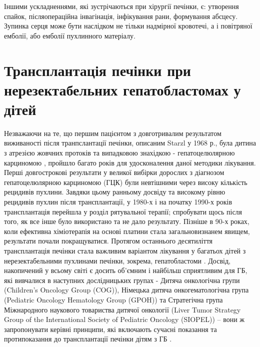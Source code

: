 Іншими ускладненнями, які зустрічаються при хірургії печінки, є: утворення спайок, післяопераційна інвагінація, інфікування рани, формування абсцесу. Зупинка серця може бути наслідком не тільки надмірної кровотечі, а і повітряної емболії, або емболії пухлинного матеріалу. 

\section{Трансплантація печінки при нерезектабельних гепатобластомах у дітей}
Незважаючи на те, що першим пацієнтом з довготривалим результатом виживаності після транпслантації печінки, описаним Starzl у 1968 р., була дитина з атрезією жовчних протоків та випадковою знахідкою - гепатоцелюлярною карциномою \cite{pmid24734315}, пройшло багато років для удосконалення даної методики лікування. Перші довгострокові результати у великої вибірки дорослих з діагнозом гепатоцелюлярною карциномою (ГЦК) були невтішними через високу кількість рецидивів пухлини. Завдяки цьому ранньому досвіду та високому рівню рецидивів пухлин після трансплантації, у 1980-х і на початку 1990-х років трансплантація перейшла у розділ рятувальної терапії; спробувати щось після того, як все інше було використано та не дало результату. Пізніше в 90-х роках, коли ефективна хіміотерапія на основі платини стала загальновизнанем явищем, результати почали покращуватися. Протягом останнього десятиліття трансплантація печінки стала важливим варіантом лікування у багатьох дітей з нерезектабельними пухлинами печінки, зокрема, гепатобластоми \cite{pmid20922397}. Досвід, накопичений у всьому світі є досить об’ємним і найбільш сприятливим для ГБ, які вивчалися в  наступних дослідницьких групах - Дитяча онкологічна групи (Children’s Oncology Group (COG)), Німецька дитяча онкогематологічна група (Pediatric Oncology Hematology Group (GPOH)) та Стратегічна група Міжнародного наукового товариства дитячої онкології (Liver Tumor Strategy Group of the International Society of Pediatric Oncology (SIOPEL)) – вони ж запропонувати керівні принципи, які включають сучасні показання та протипоказання до трансплантації печінки дітям з ГБ \cite{pmid20223320}.


